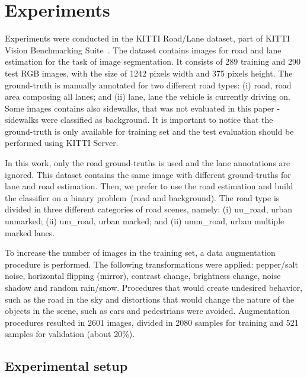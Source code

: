 \section{Experiments}
\label{sec:experiments}

Experiments were conducted in the KITTI Road/Lane dataset, part of KITTI Vision Benchmarking Suite~\cite{KITTI}. The dataset  contains  images for road and lane estimation for the task of image segmentation. It consists of 289 training and 290 test RGB images, with the size of 1242 pixels width and 375 pixels height. The ground-truth is manually annotated for two different road types: (i) road, road area composing all lanes; and (ii) lane, lane the vehicle is currently driving on. Some images contains also sidewalks, that was not evaluated in this paper - sidewalks were classified as background. It is important to notice that the ground-truth is only available for training set and the test evaluation should be performed using KITTI Server.

 

In this work, only the road ground-truths is used and the lane annotations are ignored. This dataset contains the same image with different ground-truths for lane and road estimation. Then, we prefer to use the road estimation and build the classifier on a binary problem~(road and background). The road type is divided in three different categories of road scenes, namely: (i) uu\_road, urban unmarked; (ii) um\_road, urban marked; and (ii) umm\_road, urban multiple marked lanes.  

  

To increase the number of images in the training set, a data augmentation procedure is performed. The following transformations were applied: pepper/salt noise, horizontal flipping (mirror), contrast change, brightness change, noise shadow and random rain/snow. Procedures that would create undesired behavior, such as the road in the sky and distortions that would change the nature of the objects in the scene, such as cars and pedestrians were avoided. Augmentation procedures resulted in 2601 images, divided in 2080 samples for training and 521 samples for validation (about 20\%). 


\subsection{Experimental setup}
   
